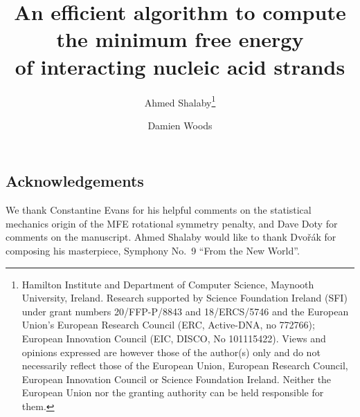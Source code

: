 \documentclass[11pt,letterpaper]{article}  %
\title{\Large An efficient algorithm to compute the minimum free energy\\ of interacting nucleic acid strands
}
\author{Ahmed Shalaby\thanks{Hamilton Institute and Department of Computer Science, Maynooth University, Ireland. Research supported by Science Foundation Ireland (SFI) under grant numbers 20/FFP-P/8843 and 18/ERCS/5746 and the European Union's European Research Council (ERC, Active-DNA, no 772766); European Innovation Council  (EIC, DISCO, No 101115422). Views and opinions expressed are however those of the author(s) only and do not necessarily reflect those of the European Union, European Research Council,  European Innovation Council or Science Foundation Ireland. Neither the European Union nor the granting authority can be held responsible for them.} 
\and Damien Woods\footnotemark[1]}
\date{}
\theoremstyle{definition}  %
\begin{document}
	\maketitle
	\pagestyle{plain}
	
	
	 
	
	 
	
	\subsection*{Acknowledgements} 
	We thank Constantine Evans for his helpful comments on the statistical mechanics origin of the MFE rotational symmetry penalty, and Dave Doty for comments on the manuscript. Ahmed Shalaby would like to thank Dvořák for composing his masterpiece, Symphony No.~9 ``From the New World''. 
	
	   
	
	
	\newpage
	\appendix
	 \newpage
	 
	
	
\end{document}
